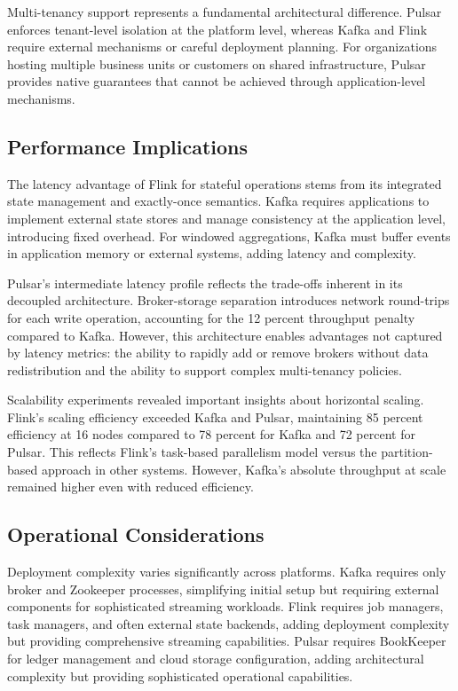 \documentclass[10pt,twocolumn]{article}
\begin{document}
Multi-tenancy support represents a fundamental architectural difference. Pulsar enforces tenant-level isolation at the platform level, whereas Kafka and Flink require external mechanisms or careful deployment planning. For organizations hosting multiple business units or customers on shared infrastructure, Pulsar provides native guarantees that cannot be achieved through application-level mechanisms.

\subsection{Performance Implications}

The latency advantage of Flink for stateful operations stems from its integrated state management and exactly-once semantics. Kafka requires applications to implement external state stores and manage consistency at the application level, introducing fixed overhead. For windowed aggregations, Kafka must buffer events in application memory or external systems, adding latency and complexity.

Pulsar's intermediate latency profile reflects the trade-offs inherent in its decoupled architecture. Broker-storage separation introduces network round-trips for each write operation, accounting for the 12 percent throughput penalty compared to Kafka. However, this architecture enables advantages not captured by latency metrics: the ability to rapidly add or remove brokers without data redistribution and the ability to support complex multi-tenancy policies.

Scalability experiments revealed important insights about horizontal scaling. Flink's scaling efficiency exceeded Kafka and Pulsar, maintaining 85 percent efficiency at 16 nodes compared to 78 percent for Kafka and 72 percent for Pulsar. This reflects Flink's task-based parallelism model versus the partition-based approach in other systems. However, Kafka's absolute throughput at scale remained higher even with reduced efficiency.

\subsection{Operational Considerations}

Deployment complexity varies significantly across platforms. Kafka requires only broker and Zookeeper processes, simplifying initial setup but requiring external components for sophisticated streaming workloads. Flink requires job managers, task managers, and often external state backends, adding deployment complexity but providing comprehensive streaming capabilities. Pulsar requires BookKeeper for ledger management and cloud storage configuration, adding architectural complexity but providing sophisticated operational capabilities.
\end{document}
